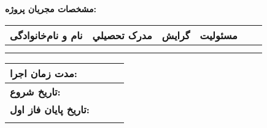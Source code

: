 {{	\raggedleft\tablefont\textbf{مشخصات مجريان پروژه: }\\
	\begin{table}[H]
	\centering
	\renewcommand{\arraystretch}{1.2}
	\begin{tabular}{Im{0.2\textwidth}|m{0.2\textwidth}|m{0.2\textwidth}|m{0.2\textwidth}I}\whline
	\tablefont\textbf{نام و نام‌خانوادگی}&\tablefont\textbf{مدرک تحصيلي}&\tablefont\textbf{گرايش}&\tablefont\textbf{مسئوليت}\\\hline
	\fulltable\\
        \whline
	\end{tabular}
	\end{table}
	\begin{table}[H]
	\renewcommand{\arraystretch}{1.2}
	\begin{tabular}{Im{0.2\textwidth}|m{0.2\textwidth}I}\whline
	\tablefont\textbf{مدت زمان اجرا:}&\tablefont\textbf{\@executionTime}\\\hline
	\tablefont\textbf{تاريخ شروع:}&\tablefont\textbf{\@startData}\\\hline
	\tablefont\textbf{تاريخ پايان فاز اول:}&\tablefont\textbf{\@stopData}\\\whline
	\end{tabular}
	\end{table}
	\clearpage}
}%


\let\oldmaketitle\maketitle
\renewcommand{\maketitle}{
	\ifthenelse{\equal{\@titleStyle}{presentation}}{\presStyle}{
		\ifthenelse{\equal{\@titleStyle}{pejohesh}}{\pejoheshStyle}{
			\ifthenelse{\equal{\@titleStyle}{lshort}}{\lshortStyle}{
				\ifthenelse{\equal{\@titleStyle}{proposal}}{\proposalStyle}{
					\ifthenelse{\equal{\@titleStyle}{thesis}}{\thesisStyleOO}{
						\ifthenelse{\equal{\@titleStyle}{proposalStyle}}{\proposalStyle}{
							\ifthenelse{\equal{\@titleStyle}{presStyleLogo}}{\presStyleLogo}{
								\oldmaketitle
							}
						} %
					} %
				}%
			}%
		}%
	}%
}%


\makeatother







